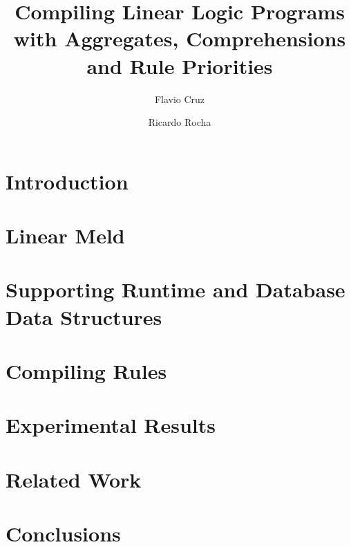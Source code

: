 \documentclass{llncs}
\begin{document}
\newcommand{\cmu}{\ensuremath{^\dag}}
\newcommand{\fcup}{\ensuremath{^\ddag}}
\pagestyle{headings}  %
\mainmatter              %
%
\title{Compiling Linear Logic Programs with Aggregates, Comprehensions and Rule
Priorities}
%
\author{Flavio Cruz \and Ricardo Rocha}


\maketitle

\begin{abstract}

\end{abstract}

\section{Introduction}


\section{Linear Meld}


\section{Supporting Runtime and Database Data Structures}\label{sec:data_structures}



\section{Compiling Rules}


\section{Experimental Results}\label{results}


\section{Related Work}


\section{Conclusions}




\end{document}
